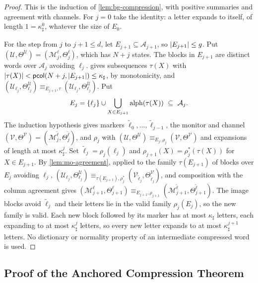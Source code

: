 \begin{proof}
This is the induction of \cref{lem:bg-compression}, with positive
summaries and agreement with channels. For $j=0$ take the identity: a letter
expands to itself, of length $1=\kappa_\sharp^0$, whatever the size of $E_0$.

For the step from $j$ to $j+1\le d$, let $E_{j+1}\subseteq\mathcal A_{j+1}$, so
$\lvert E_{j+1}\rvert\le g$. Put $(\mathcal U,\Theta^{\mathcal U})=(\mathcal
M^{\boldsymbol\ell}_j,\Theta^{\boldsymbol\ell}_j)$, which has $N+j$ states. The
blocks in $E_{j+1}$ are distinct words over $\mathcal A_j$ avoiding $\ell_j$.
 gives subsequences $\tau(X)$ with
$\lvert \tau(X)\rvert<\mathsf{pcol}(N+j,\lvert E_{j+1}\rvert)\le\kappa_\sharp$, by monotonicity,
and $(\mathcal U_{\ell_j},\Theta^{\mathcal U}_{\ell_j})\equiv_{E_{j+1},\tau}
(\mathcal U_{\ell_j},\Theta^{\mathcal U}_{\ell_j})$. Put
\[
 E_j=\{\ell_j\}\cup\bigcup_{X\in E_{j+1}}\operatorname{alph}(\tau(X))\ \subseteq\ \mathcal A_j .
\]
The induction hypothesis gives markers $\widetilde\ell_0,\ldots,
\widetilde\ell_{j-1}$, the monitor and channel $(\mathcal V,\Theta^{\mathcal
V})=(\mathcal M^{\widetilde{\boldsymbol\ell}}_j,
\Theta^{\widetilde{\boldsymbol\ell}}_j)$, and $\rho_j$ with $(\mathcal
U,\Theta^{\mathcal U})\equiv_{E_j,\rho_j}(\mathcal V,\Theta^{\mathcal V})$ and
expansions of length at most $\kappa_\sharp^j$. Set
$\widetilde\ell_j=\rho_j(\ell_j)$ and $\rho_{j+1}(X)=\rho_j^*(\tau(X))$ for
$X\in E_{j+1}$. By \cref{lem:mo-agreement}, applied to the family
$\tau(E_{j+1})$ of blocks over $E_j$ avoiding $\ell_j$,
$(\mathcal U_{\ell_j},\Theta^{\mathcal U}_{\ell_j})\equiv_{\tau(E_{j+1}),
\rho_j^*}(\mathcal V_{\widetilde\ell_j},\Theta^{\mathcal V}_{\widetilde\ell_j})$,
and composition with the column agreement gives
$(\mathcal M^{\boldsymbol\ell}_{j+1},\Theta^{\boldsymbol\ell}_{j+1})
\equiv_{E_{j+1},\rho_{j+1}}(\mathcal M^{\widetilde{\boldsymbol\ell}}_{j+1},
\Theta^{\widetilde{\boldsymbol\ell}}_{j+1})$. The image blocks avoid
$\widetilde\ell_j$ and their letters lie in the valid family $\rho_j(E_j)$, so
the new family is valid. Each new block followed by its marker has at most
$\kappa_\sharp$ letters, each expanding to at most $\kappa_\sharp^j$ letters, so
every new letter expands to at most $\kappa_\sharp^{j+1}$ letters. No dictionary
or normality property of an intermediate compressed word is used.
\end{proof}

\subsection{Proof of the Anchored Compression Theorem}\label{app:mo-proof}


